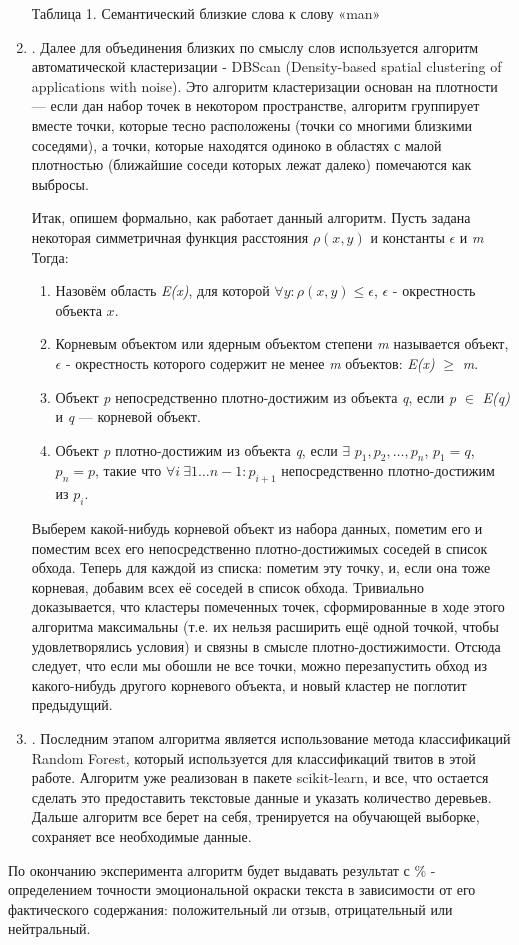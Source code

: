 \documentclass[14pt,a4paper]{scrartcl}
\begin{document}
\begin{enumerate}
\begin{center}
\medskip
Таблица 1. Семантический близкие слова к слову «man»
\end{center}

\item {}. Далее для объединения близких по смыслу слов используется алгоритм автоматической кластеризации - DBScan (Density-based spatial clustering of applications with noise). Это алгоритм кластеризации основан на плотности — если дан набор точек в некотором пространстве, алгоритм группирует вместе точки, которые тесно расположены (точки со многими близкими соседями), а  точки, которые находятся одиноко в областях с малой плотностью (ближайшие соседи которых лежат далеко) помечаются как выбросы. 

Итак, опишем формально, как работает данный алгоритм. Пусть задана некоторая симметричная функция расстояния $\rho(x,y)$ и константы $\epsilon$ и {\em m} Тогда:
\begin{enumerate}
\item Назовём область {\em E(x)}, для которой $\forall y: \rho(x,y) \le \epsilon$, $\epsilon$ - окрестность объекта $x$.
\item Корневым объектом или ядерным объектом степени {\em m} называется объект, $\epsilon$ - окрестность которого содержит не менее {\em m} объектов: {\em E(x)} $\ge$ {\em m}.
\item Объект {\em p} непосредственно плотно-достижим из объекта {\em q}, если {\em p} $\in$ {\em E(q)} и {\em q} — корневой объект.
\item Объект {\em p} плотно-достижим из объекта {\em q}, если $\exists$ {\em $p_1,p_2,\dots, p_n$}, $p_1 = q$, $p_n = p$, такие что $\forall i ~\exists 1\dots n-1: p_{i+1}$ непосредственно плотно-достижим из $p_i$. 
\end{enumerate}
Выберем какой-нибудь корневой объект  из набора данных, пометим его и поместим всех его непосредственно плотно-достижимых соседей в список обхода. Теперь для каждой  из списка: пометим эту точку, и, если она тоже корневая, добавим всех её соседей в список обхода. Тривиально доказывается, что кластеры помеченных точек, сформированные в ходе этого алгоритма максимальны (т.е. их нельзя расширить ещё одной точкой, чтобы удовлетворялись условия) и связны в смысле плотно-достижимости. Отсюда следует, что если мы обошли не все точки, можно перезапустить обход из какого-нибудь другого корневого объекта, и новый кластер не поглотит предыдущий.

\item {}. Последним этапом алгоритма является использование метода классификаций Random Forest, который используется для классификаций твитов в этой работе. Алгоритм уже реализован в пакете scikit-learn, и все, что остается сделать это предоставить текстовые данные и указать количество деревьев. Дальше алгоритм все берет на себя, тренируется на обучающей выборке, сохраняет все необходимые данные.
\end{enumerate}
По окончанию эксперимента алгоритм будет выдавать результат с \% - определением точности эмоциональной окраски текста в зависимости от его фактического содержания: положительный ли отзыв, отрицательный или нейтральный.
\end{document}
